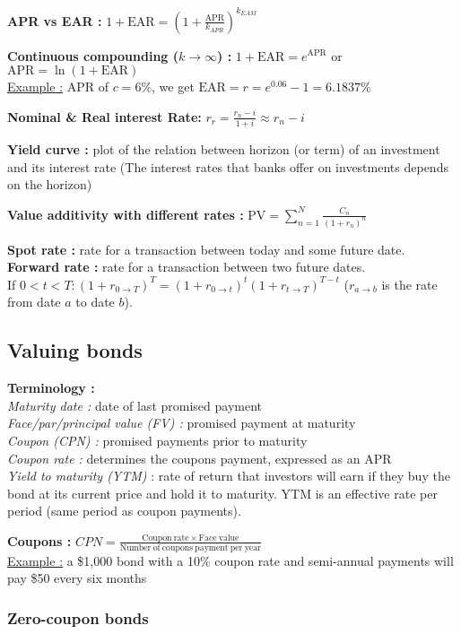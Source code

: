 \documentclass[a4paper,twocolumn]{article}
\newcommand{\PV} {\mathrm{PV}}
\newcommand{\APR} {\mathrm{APR}}
\newcommand{\EAR} {\mathrm{EAR}}
\begin{document}
\textbf{APR vs EAR :} $1 + \EAR = \left( 1 + \frac{\APR}{k_{APR}} \right)^{k_{EAM}}$

\textbf{Continuous compounding ($k \to \infty$) :} $1 + \EAR = e^\APR$ or $\APR = \ln (1 + \EAR)$\\
\underline{Example :} APR of $c=6\%$, we get $\EAR = r = e^{0.06} - 1 = 6.1837\%$

\textbf{Nominal \& Real interest Rate:} $r_r = \frac{r_n - i}{1+i} \approx r_n -i$

\textbf{Yield curve :} plot of the relation between horizon (or term) of an investment and its interest rate (The interest rates that banks offer on investments depends on the horizon)

\textbf{Value additivity with different rates :} $\PV = \sum_{n=1}^N \frac{C_n}{(1+r_n)^n}$

\textbf{Spot rate :} rate for a transaction between today and some future date.\\
\textbf{Forward rate :} rate for a transaction between two future dates.\\
If $0 < t < T : (1 + r_{0 \to T})^T = (1 + r_{0 \to t})^t (1 + r_{t \to T})^{T-t}$ ($r_{a \to b}$ is the rate from date $a$ to date $b$).

\subsection*{Valuing bonds}

\textbf{Terminology :}\\
\textit{Maturity date :} date of last promised payment\\
\textit{Face/par/principal value (FV) :} promised payment at maturity\\
\textit{Coupon (CPN) :} promised payments prior to maturity\\
\textit{Coupon rate :} determines the coupons payment, expressed as an APR\\
\textit{Yield to maturity (YTM)} : rate of return that investors will earn if they buy the bond at its current price and hold it to maturity. YTM is an effective rate per period (same period as coupon payments).

\textbf{Coupons :} $CPN = \frac{\mathrm{Coupon\ rate} \times \mathrm{Face\ value}}{\mathrm{Number\ of\ coupons\ payment\ per\ year}}$\\
\underline{Example :}  a \$1,000 bond with a 10\% coupon rate and semi-annual payments will pay \$50 every six months

\subsubsection*{Zero-coupon bonds}
\end{document}
